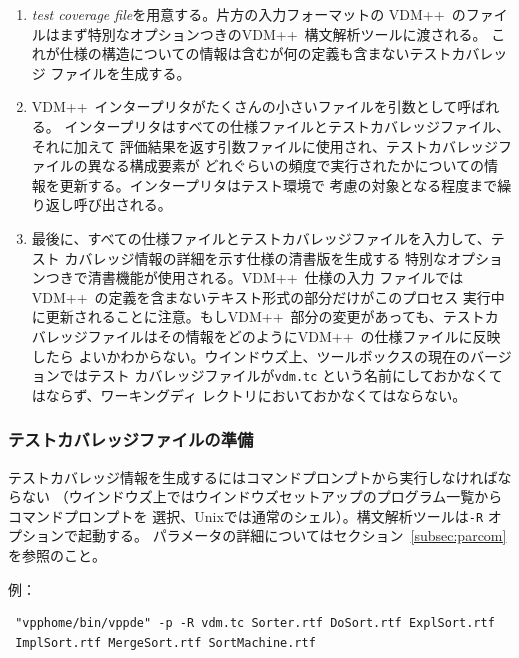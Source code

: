 \documentclass[\pformat,12pt]{jarticle}
\newcommand{\vdmslpp}{VDM++}
\begin{document}
\begin{enumerate}


\item
  {\em test coverage file}を用意する。片方の入力フォーマットの
  \vdmslpp\ のファイルはまず特別なオプションつきの\vdmslpp\ 構文解析ツールに渡される。
  これが仕様の構造についての情報は含むが何の定義も含まないテストカバレッジ
  ファイルを生成する。

\item
  \vdmslpp\ インタープリタがたくさんの小さいファイルを引数として呼ばれる。
  インタープリタはすべての仕様ファイルとテストカバレッジファイル、それに加えて
  評価結果を返す引数ファイルに使用され、テストカバレッジファイルの異なる構成要素が
  どれぐらいの頻度で実行されたかについての情報を更新する。インタープリタはテスト環境で
  考慮の対象となる程度まで繰り返し呼び出される。
  
\item
  最後に、すべての仕様ファイルとテストカバレッジファイルを入力して、テスト
  カバレッジ情報の詳細を示す仕様の清書版を生成する
  特別なオプションつきで清書機能が使用される。\vdmslpp\ 仕様の入力
  ファイルでは\vdmslpp\ の定義を含まないテキスト形式の部分だけがこのプロセス
  実行中に更新されることに注意。もし\vdmslpp\ 部分の変更があっても、テストカ
  バレッジファイルはその情報をどのように\vdmslpp\ の仕様ファイルに反映したら
  よいかわからない。ウインドウズ上、ツールボックスの現在のバージョンではテスト
  カバレッジファイルが\texttt{vdm.tc} という名前にしておかなくてはならず、ワーキングディ
  レクトリにおいておかなくてはならない。

\end{enumerate}


\subsubsection{テストカバレッジファイルの準備}

テストカバレッジ情報を生成するにはコマンドプロンプトから実行しなければならない
（ウインドウズ上ではウインドウズセットアップのプログラム一覧からコマンドプロンプトを
選択、Unixでは通常のシェル）。構文解析ツールは{\tt -R} オプションで起動する。
パラメータの詳細についてはセクション~\ref{subsec:parcom}を参照のこと。

例：
\begin{verbatim}
 "vpphome/bin/vppde" -p -R vdm.tc Sorter.rtf DoSort.rtf ExplSort.rtf
 ImplSort.rtf MergeSort.rtf SortMachine.rtf
\end{verbatim}
\end{document}
